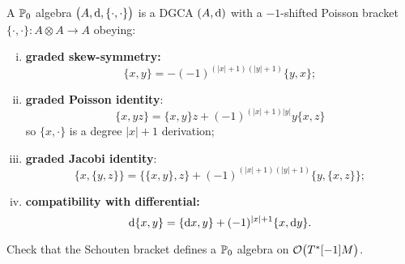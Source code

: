 \begin{definition}
  A $\mathbb{P}_0$ algebra $\bigl( A, \mathrm{d}, \{ \cdot, \cdot \} \bigr)$ is a DGCA $(A, \mathrm{d})$ with a $-1$-shifted Poisson bracket $\{ \cdot, \cdot \}: A \otimes A \rightarrow A$ obeying:
  \begin{enumerate}[i)]
    \item \textbf{graded skew-symmetry:}
      \begin{equation*}
        \{x, y\} = - (-1)^{(|x|+1)(|y|+1)} \{y, x\};
      \end{equation*}
    \item \textbf{graded Poisson identity}:
      \begin{equation*}
        \{x, yz \} = \{x, y\} z + (-1)^{(|x|+1)|y|} y \{x, z\}
      \end{equation*}
      so $\{x, \cdot \}$ is a degree $|x|+1$ derivation;
    \item \textbf{graded Jacobi identity}:
      \begin{equation*}
        \{x, \{y, z\} \} = \{ \{x, y\}, z \} + (-1)^{(|x|+1)(|y|+1)} \{y, \{x, z\} \};
      \end{equation*}
    \item \textbf{compatibility with differential:}
      \begin{equation*}
        \mathrm{d} \{x, y\} = \{ \mathrm{d} x, y \} + (-1)^{|x|+1} \{x, \mathrm{d} y \}.
      \end{equation*}
  \end{enumerate}
\end{definition}

\begin{exercise}
  Check that the Schouten bracket defines a $\mathbb{P}_0$ algebra on $\mathcal{O}\bigl(T^*[-1] M \bigr)$.
\end{exercise}
